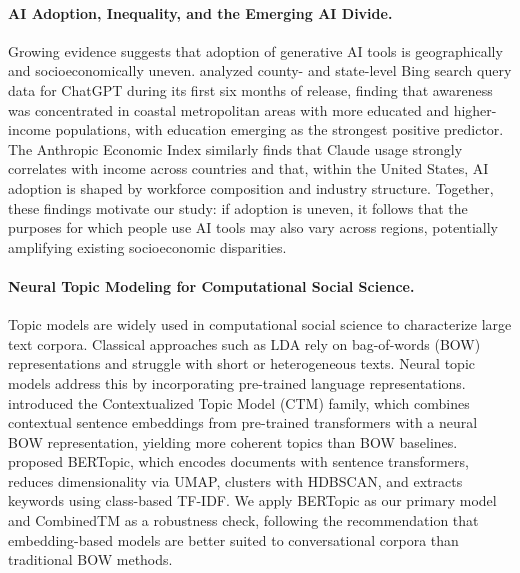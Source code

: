 \documentclass[11pt]{article}
\begin{document}
\paragraph{AI Adoption, Inequality, and the Emerging AI Divide.}

Growing evidence suggests that adoption of generative AI tools is geographically and socioeconomically uneven. \citet{daepp2024emerging} analyzed county- and state-level Bing search query data for ChatGPT during its first six months of release, finding that awareness was concentrated in coastal metropolitan areas with more educated and higher-income populations, with education emerging as the strongest positive predictor. The Anthropic Economic Index \citep{appel2025anthropic} similarly finds that Claude usage strongly correlates with income across countries and that, within the United States, AI adoption is shaped by workforce composition and industry structure. Together, these findings motivate our study: if adoption is uneven, it follows that the purposes for which people use AI tools may also vary across regions, potentially amplifying existing socioeconomic disparities. 

\paragraph{Neural Topic Modeling for Computational Social Science.}

Topic models are widely used in computational social science to characterize large text corpora. Classical approaches such as LDA \citep{blei2003lda} rely on bag-of-words (BOW) representations and struggle with short or heterogeneous texts. Neural topic models address this by incorporating pre-trained language representations. \citet{bianchi2021pretraining} introduced the Contextualized Topic Model (CTM) family, which combines contextual sentence embeddings from pre-trained transformers with a neural BOW representation, yielding more coherent topics than BOW baselines. \citet{grootendorst2022bertopic} proposed BERTopic, which encodes documents with sentence transformers, reduces dimensionality via UMAP, clusters with HDBSCAN, and extracts keywords using class-based TF-IDF. We apply BERTopic as our primary model and CombinedTM as a robustness check, following the recommendation that embedding-based models are better suited to conversational corpora than traditional BOW methods.
\end{document}
